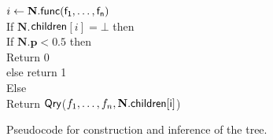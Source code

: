 \begin{figure}[h]
{		
		$i\gets\textbf{N}.\sf{func}({f_1,\dots,f_n})$\\
		If $\textbf{N}.$$\sf{children}$$[i]=\bot$ then\\
		\ind If $\textbf{N}.\textbf{p} < 0.5$ then \\
		\ind \ind Return 0\\
		\ind else return 1\\
		Else \\
		\ind Return $\sf{Qry}$(${f_1,\dots,f_n},\mathnormal{\textbf{N}.\sf{children}[i]}$)\\
	}
	\vspace{-.5cm}
	\caption{Pseudocode for construction and inference of the tree.}
	\label{fig:pseudocode}
	\vspace{-.5cm}
\end{figure}

